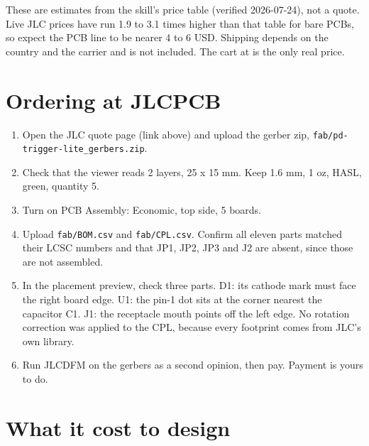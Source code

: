 These are estimates from the skill's price table (verified 2026-07-24), not a quote. Live JLC
prices have run 1.9 to 3.1 times higher than that table for bare PCBs, so expect the PCB line to be
nearer 4 to 6 USD. Shipping depends on the country and the carrier and is not included. The cart
at  is the only real price.


\section{Ordering at JLCPCB}

\begin{enumerate}
\item Open the JLC quote page (link above) and upload the gerber zip,
\texttt{fab/pd-trigger-lite\_gerbers.zip}.
\item Check that the viewer reads 2 layers, 25 x 15 mm. Keep 1.6 mm, 1 oz, HASL, green, quantity 5.
\item Turn on PCB Assembly: Economic, top side, 5 boards.
\item Upload \texttt{fab/BOM.csv} and \texttt{fab/CPL.csv}. Confirm all eleven parts matched their
LCSC numbers and that JP1, JP2, JP3 and J2 are absent, since those are not assembled.
\item In the placement preview, check three parts. D1: its cathode mark must face the right
board edge. U1: the pin-1 dot sits at the corner nearest the capacitor C1. J1: the receptacle mouth
points off the left edge. No rotation correction was applied to the CPL, because every footprint
comes from JLC's own library.
\item Run JLCDFM on the gerbers as a second opinion, then pay. Payment is yours to do.
\end{enumerate}

\section{What it cost to design}

